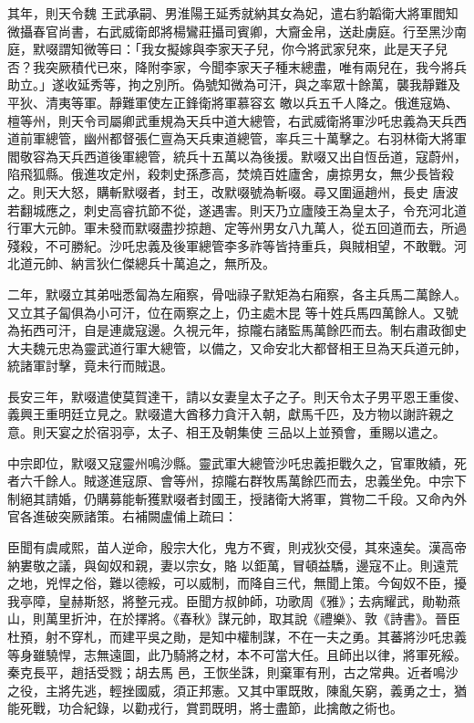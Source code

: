 \begin{pinyinscope}
 其年，則天令魏
 王武承嗣、男淮陽王延秀就納其女為妃，遣右豹韜衛大將軍閻知微攝春官尚書，右武威衛郎將楊鸞莊攝司賓卿，大齎金帛，送赴虜庭。行至黑沙南庭，默啜謂知微等曰：「我女擬嫁與李家天子兒，你今將武家兒來，此是天子兒否？我突厥積代已來，降附李家，今聞李家天子種末總盡，唯有兩兒在，我今將兵助立。」遂收延秀等，拘之別所。偽號知微為可汗，與之率眾十餘萬，襲我靜難及平狄、清夷等軍。靜難軍使左正鋒衛將軍慕容玄
 皦以兵五千人降之。俄進寇媯、檀等州，則天令司屬卿武重規為天兵中道大總管，右武威衛將軍沙吒忠義為天兵西道前軍總管，幽州都督張仁亶為天兵東道總管，率兵三十萬擊之。右羽林衛大將軍閻敬容為天兵西道後軍總管，統兵十五萬以為後援。默啜又出自恆岳道，寇蔚州，陷飛狐縣。俄進攻定州，殺刺史孫彥高，焚燒百姓廬舍，虜掠男女，無少長皆殺之。則天大怒，購斬默啜者，封王，改默啜號為斬啜。尋又圍逼趙州，長史
 唐波若翻城應之，刺史高睿抗節不從，遂遇害。則天乃立廬陵王為皇太子，令充河北道行軍大元帥。軍未發而默啜盡抄掠趙、定等州男女八九萬人，從五回道而去，所過殘殺，不可勝紀。沙吒忠義及後軍總管李多祚等皆持重兵，與賊相望，不敢戰。河北道元帥、納言狄仁傑總兵十萬追之，無所及。



 二年，默啜立其弟咄悉匐為左廂察，骨咄祿子默矩為右廂察，各主兵馬二萬餘人。又立其子匐俱為小可汗，位在兩察之上，仍主處木昆
 等十姓兵馬四萬餘人。又號為拓西可汗，自是連歲寇邊。久視元年，掠隴右諸監馬萬餘匹而去。制右肅政御史大夫魏元忠為靈武道行軍大總管，以備之，又命安北大都督相王旦為天兵道元帥，統諸軍討擊，竟未行而賊退。



 長安三年，默啜遣使莫賀達干，請以女妻皇太子之子。則天令太子男平恩王重俊、義興王重明廷立見之。默啜遣大酋移力貪汗入朝，獻馬千匹，及方物以謝許親之意。則天宴之於宿羽亭，太子、相王及朝集使
 三品以上並預會，重賜以遣之。



 中宗即位，默啜又寇靈州鳴沙縣。靈武軍大總管沙吒忠義拒戰久之，官軍敗績，死者六千餘人。賊遂進寇原、會等州，掠隴右群牧馬萬餘匹而去，忠義坐免。中宗下制絕其請婚，仍購募能斬獲默啜者封國王，授諸衛大將軍，賞物二千段。又命內外官各進破突厥諸策。右補闕盧俌上疏曰：



 臣聞有虞咸熙，苗人逆命，殷宗大化，鬼方不賓，則戎狄交侵，其來遠矣。漢高帝納婁敬之議，與匈奴和親，妻以宗女，賂
 以鉅萬，冒頓益驕，邊寇不止。則遠荒之地，兇悍之俗，難以德綏，可以威制，而降自三代，無聞上策。今匈奴不臣，擾我亭障，皇赫斯怒，將整元戎。臣聞方叔帥師，功歌周《雅》；去病耀武，勛勒燕山，則萬里折沖，在於擇將。《春秋》謀元帥，取其說《禮樂》、敦《詩書》。晉臣杜預，射不穿札，而建平吳之勛，是知中權制謀，不在一夫之勇。其蕃將沙吒忠義等身雖驍悍，志無遠圖，此乃騎將之材，本不可當大任。且師出以律，將軍死綏。秦克長平，趙括受戮；胡去馬
 邑，王恢坐誅，則棄軍有刑，古之常典。近者鳴沙之役，主將先逃，輕挫國威，須正邦憲。又其中軍既敗，陳亂矢窮，義勇之士，猶能死戰，功合紀錄，以勸戎行，賞罰既明，將士盡節，此擒敵之術也。




\end{pinyinscope}

